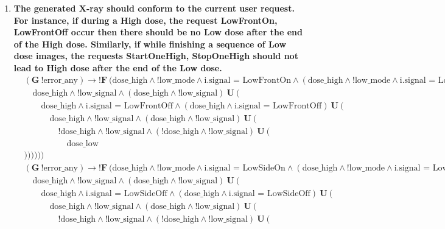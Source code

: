 \documentclass[a4paper,10pt]{article}
\newcommand{\LTLG}{\mathbf{G~}}
\newcommand{\LTLF}{\mathbf{F~}}
\newcommand{\LTLU}{\mathbf{~U~}}
\newcommand{\imply}{\rightarrow}
\newcommand{\doselow}{\textrm{dose\_low}}
\newcommand{\dosehigh}{\textrm{dose\_high}}
\newcommand{\lowsignal}{\textrm{low\_signal}}
\newcommand{\errorany}{\textrm{error\_any}}
\newcommand{\lowmode}{\textrm{low\_mode}}
\begin{document}
\begin{enumerate}
		\item \textbf{The generated X-ray should conform to the current user request. For instance, if during a High dose, the request LowFrontOn, LowFrontOff occur then there should be no Low dose after the end of the High dose. Similarly, if while finishing a sequence of Low dose images, the requests StartOneHigh, StopOneHigh should not lead to High dose after the end of the Low dose.}
			\begin{align*}
				&(\LTLG !\errorany) \imply !\LTLF (\dosehigh \land !\lowmode \land \textrm{i.signal = LowFrontOn} \land (\dosehigh \land !\lowmode \land \textrm{i.signal = LowFrontOn}) \LTLU ( \\
				&	\hspace{1em}\dosehigh \land !\lowsignal \land (\dosehigh \land !\lowsignal) \LTLU ( \\
				&		\hspace{2em}\dosehigh \land \textrm{i.signal = LowFrontOff} \land (\dosehigh \land \textrm{i.signal = LowFrontOff}) \LTLU ( \\
				&			\hspace{3em}\dosehigh \land !\lowsignal \land (\dosehigh \land !\lowsignal) \LTLU ( \\
				&				\hspace{4em}!\dosehigh \land !\lowsignal \land (!\dosehigh \land !\lowsignal) \LTLU ( \\
				&					\hspace{5em}\doselow \\
				&))))))
			\end{align*}
			\begin{align*}
				&(\LTLG !\errorany) \imply !\LTLF (\dosehigh \land !\lowmode \land \textrm{i.signal = LowSideOn} \land (\dosehigh \land !\lowmode \land \textrm{i.signal = LowSideOn}) \LTLU ( \\
				&	\hspace{1em}\dosehigh \land !\lowsignal \land (\dosehigh \land !\lowsignal) \LTLU ( \\
				&		\hspace{2em}\dosehigh \land \textrm{i.signal = LowSideOff} \land (\dosehigh \land \textrm{i.signal = LowSideOff}) \LTLU ( \\
				&			\hspace{3em}\dosehigh \land !\lowsignal \land (\dosehigh \land !\lowsignal) \LTLU ( \\
				&				\hspace{4em}!\dosehigh \land !\lowsignal \land (!\dosehigh \land !\lowsignal) \LTLU ( \\

\end{align*}
\end{enumerate}
\end{document}
